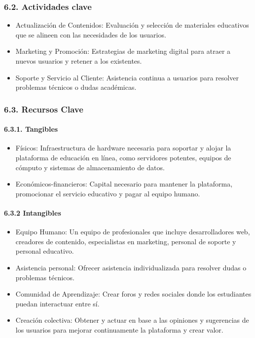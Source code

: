 \documentclass[
]{article}
\providecommand{\tightlist}{%
  \setlength{\itemsep}{0pt}\setlength{\parskip}{0pt}}
\begin{document}
\subsubsection{6.2. Actividades clave}\label{actividades-clave}

\begin{itemize}
\tightlist
\item
  Actualización de Contenidos: Evaluación y selección de materiales
  educativos que se alineen con las necesidades de los usuarios.
\item
  Marketing y Promoción: Estrategias de marketing digital para atraer a
  nuevos usuarios y retener a los existentes.
\item
  Soporte y Servicio al Cliente: Asistencia continua a usuarios para
  resolver problemas técnicos o dudas académicas.
\end{itemize}

\subsubsection{6.3. Recursos Clave}\label{recursos-clave}

\paragraph{6.3.1. Tangibles}\label{tangibles}

\begin{itemize}
\tightlist
\item
  Físicos: Infraestructura de hardware necesaria para soportar y alojar
  la plataforma de educación en línea, como servidores potentes, equipos
  de cómputo y sistemas de almacenamiento de datos.
\item
  Económicos-financieros: Capital necesario para mantener la plataforma,
  promocionar el servicio educativo y pagar al equipo humano.
\end{itemize}

\paragraph{6.3.2 Intangibles}\label{intangibles}

\begin{itemize}
\tightlist
\item
  Equipo Humano: Un equipo de profesionales que incluye desarrolladores
  web, creadores de contenido, especialistas en marketing, personal de
  soporte y personal educativo.
\item
  Asistencia personal: Ofrecer asistencia individualizada para resolver
  dudas o problemas técnicos.
\item
  Comunidad de Aprendizaje: Crear foros y redes sociales donde los
  estudiantes puedan interactuar entre sí.
\item
  Creación colectiva: Obtener y actuar en base a las opiniones y
  sugerencias de los usuarios para mejorar continuamente la plataforma y
  crear valor.
\end{itemize}
\end{document}
